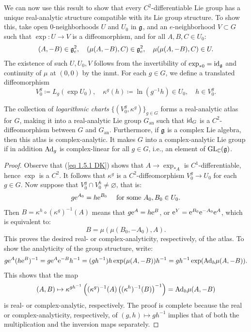 We can now use this result to show that every $C^2$-differentiable Lie group has a unique real-analytic structure compatible with its Lie group structure. To show this, take open $0$-neighborhoods $U$ and $U_0$ in $\mathfrak{g}$, and an $e$-neighborhood $V\subset G$ such that $\exp:U\to V$ is a diffeomorphism, and for all $A,B,C\in U_0$:
\[(A,-B)\in\mathfrak{g}_e^2,\quad (\mu(A,-B),C)\in\mathfrak{g}_e^2,\quad \mu(\mu(A,-B),C)\in U.\]
The existence of such $U,U_0,V$ follows from the invertibility of $\exp_{\ast 0}=\operatorname{id}_{\mathfrak{g}}$ and continuity of $\mu$ at $(0,0)$ by the \gls{inmt}. For each $g\in G$, we define a translated diffeomorphism
\[V_0^g\coloneqq L_g(\exp U_0),\quad \kappa^g(h)\coloneqq \ln(g^{-1}h)\in U_0,\quad h\in V^g_0.\]

\begin{thm}[{{\cite[Thm.~1.6.3]{DK}}}]\label{thm 1.6.3 DK}
    The collection of \emph{logarithmic charts} $\{(V_0^g,\kappa^g)\}_{g\in G}$ forms a real-analytic atlas for $G$, making it into a real-analytic Lie group $G_{\mathrm{an}}$ such that $\operatorname{id}_G$ is a $C^2$-diffeomorphism between $G$ and $G_{\mathrm{an}}$. Furthermore, if $\mathfrak{g}$ is a complex Lie algebra, then this atlas is complex-analytic. It makes $G$ into a complex-analytic Lie group if in addition $\mathrm{Ad}_g$ is complex-linear for all $g\in G$, i.e., an element of $\operatorname{GL}_{\mathbb{C}}(\mathfrak{g})$.
\end{thm}
\begin{proof}
    Observe that (\ref{eq 1.5.1 DK}) shows that $A\to \exp_{\ast A}$ is $C^1$-differentiable, hence $\exp$ is a $C^2$. It follows that $\kappa^g$ is a $C^2$-diffeomorphism $V^g_0\to U_0$ for each $g\in G$. Now suppose that $V_0^g\cap V^h_0\neq \varnothing$, that is:
    \[g \mathrm{e}^{A_0}=h\mathrm{e}^{B_0}\quad \text{ for some }A_0,B_0\in U_0.\]
    Then $B=\kappa^h\circ (\kappa^g)^{-1}(A)$ means that $g\mathrm{e}^A=h\mathrm{e}^B$, or $\mathrm{e}^Y=\mathrm{e}^{B_0}\mathrm{e}^{-A_0}\mathrm{e}^A$, which is equivalent to:
    \[B=\mu(\mu(B_0,-A_0),A).\]
    This proves the desired real- or complex-analyticity, respectively, of the atlas. To show the analyticity of the group structure, write:
    \[g \mathrm{e}^A (h\mathrm{e}^B)^{-1}=g\mathrm{e}^A\mathrm{e}^{-B}h^{-1}=(gh^{-1})h\exp(\mu(A,-B))h^{-1}=gh^{-1}\exp(\mathrm{Ad}_h\mu(A,-B)).\]
    This shows that the map 
    \[(A,B)\mapsto \kappa^{gh^{-1}}\left((\kappa^g)^{-1}(A)\left((\kappa^h)^{-1}(B)\right)^{-1}\right)=\mathrm{Ad}_h\mu(A,-B)\]
    is real- or complex-analytic, respectively. The proof is complete because the real or complex-analyticity, respectively, of $(g,h)\mapsto gh^{-1}$ implies that of both the multiplication and the inversion maps separately.
\end{proof}

